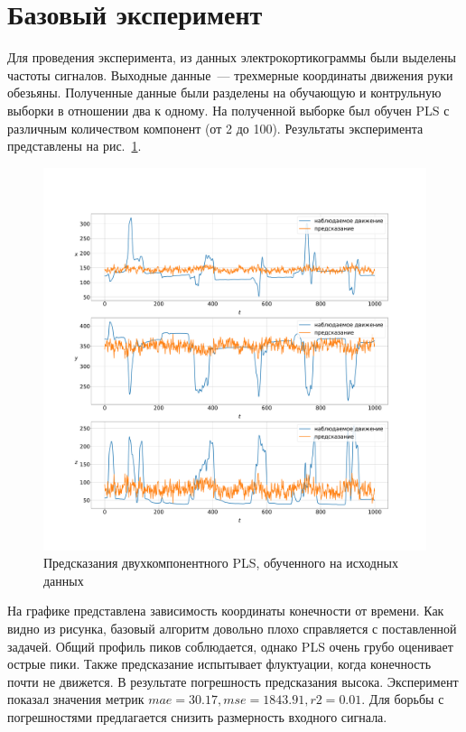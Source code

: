 \section{Базовый эксперимент}
Для проведения эксперимента, из данных электрокортикограммы были выделены частоты сигналов. Выходные данные~--- трехмерные координаты движения руки обезьяны. Полученные данные были разделены на обучающую и контрульную выборки в отношении два к одному. На полученной выборке был обучен PLS с различным количеством компонент (от 2 до 100). Результаты эксперимента представлены на рис.~\ref{fig:baseAlgo}.
\begin{figure}
  \begin{center}
    \includegraphics[width=\textwidth]{base_algo.pdf}
    \caption{Предсказания двухкомпонентного PLS, обученного на исходных данных}
    \label{fig:baseAlgo}
  \end{center}
\end{figure}
На графике представлена зависимость координаты конечности от времени. Как видно из рисунка, базовый алгоритм довольно плохо справляется с поставленной задачей. Общий профиль пиков соблюдается, однако PLS очень грубо оценивает острые пики. Также предсказание испытывает флуктуации, когда конечность почти не движется. В результате погрешность предсказания высока. Эксперимент показал значения метрик $mae = 30.17, mse = 1843.91, r2 = 0.01$. Для борьбы с погрешностями предлагается снизить размерность входного сигнала.
